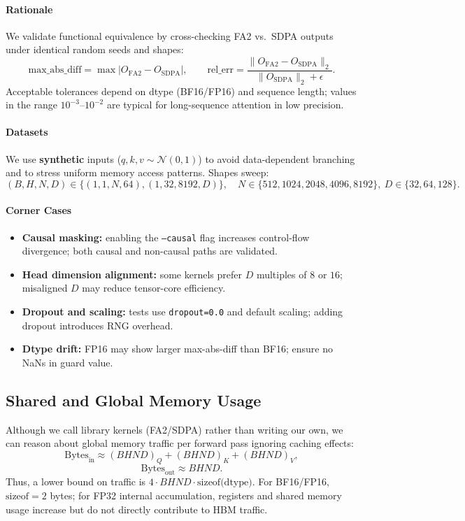 \documentclass[11pt]{article}
\begin{document}
\paragraph{Rationale}
We validate functional equivalence by cross-checking FA2 vs.\ SDPA outputs under identical random seeds and shapes:
\[
\text{max\_abs\_diff} = \max |O_{\text{FA2}} - O_{\text{SDPA}}|, \qquad
\text{rel\_err} = \frac{\|O_{\text{FA2}} - O_{\text{SDPA}}\|_2}{\|O_{\text{SDPA}}\|_2 + \epsilon}.
\]
Acceptable tolerances depend on dtype (BF16/FP16) and sequence length; values in the range $10^{-3}$–$10^{-2}$ are typical for long-sequence attention in low precision.

\paragraph{Datasets}
We use \textbf{synthetic} inputs ($q,k,v \sim \mathcal{N}(0,1)$) to avoid data-dependent branching and to stress uniform memory access patterns. Shapes sweep:
\[
(B,H,N,D) \in \{(1,1,N,64), (1,32,8192,D)\}, \quad N \in \{512,1024,2048,4096,8192\}, \ D \in \{32,64,128\}.
\]

\paragraph{Corner Cases}
\begin{itemize}
\item \textbf{Causal masking:} enabling the \texttt{--causal} flag increases control-flow divergence; both causal and non-causal paths are validated.
\item \textbf{Head dimension alignment:} some kernels prefer $D$ multiples of $8$ or $16$; misaligned $D$ may reduce tensor-core efficiency.
\item \textbf{Dropout and scaling:} tests use \texttt{dropout=0.0} and default scaling; adding dropout introduces RNG overhead.
\item \textbf{Dtype drift:} FP16 may show larger max-abs-diff than BF16; ensure no NaNs in guard value.
\end{itemize}

\subsection{Shared and Global Memory Usage}

Although we call library kernels (FA2/SDPA) rather than writing our own, we can reason about global memory traffic per forward pass ignoring caching effects:
\[
\text{Bytes}_{\text{in}} \approx (BHN D)_Q + (BHN D)_K + (BHN D)_V,
\]
\[
\text{Bytes}_{\text{out}} \approx BHN D.
\]
Thus, a lower bound on traffic is $4 \cdot BHND \cdot \text{sizeof(dtype)}$. For BF16/FP16, $\text{sizeof}=2$ bytes; for FP32 internal accumulation, registers and shared memory usage increase but do not directly contribute to HBM traffic.
\end{document}

